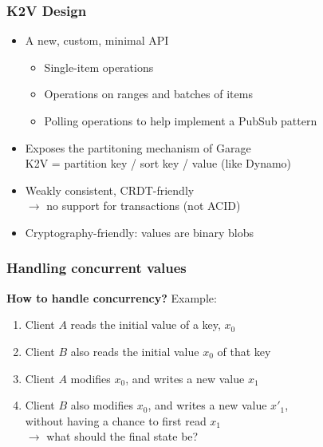 \documentclass[aspectratio=169]{beamer}
\begin{document}
\begin{frame}
	\frametitle{K2V Design}
	\begin{itemize}
		\item A new, custom, minimal API\\
			\vspace{.5em}
			\begin{itemize}
				\item Single-item operations
				\item Operations on ranges and batches of items
				\item Polling operations to help implement a PubSub pattern
			\end{itemize}
			\vspace{1em}
		\item<2-> Exposes the partitoning mechanism of Garage\\
			K2V = partition key / sort key / value (like Dynamo)
			\vspace{1em}
		\item<3-> Weakly consistent, CRDT-friendly\\
			$\to$ no support for transactions (not ACID)
			\vspace{1em}
		\item<4-> Cryptography-friendly: values are binary blobs
	\end{itemize}
\end{frame}

\begin{frame}
	\frametitle{Handling concurrent values}
	\textbf{How to handle concurrency?} Example:
	\vspace{1em}
	\begin{enumerate}
		\item Client $A$ reads the initial value of a key, $x_0$
			\vspace{1em}
		\item<2-> Client $B$ also reads the initial value $x_0$ of that key
			\vspace{1em}
		\item<3-> Client $A$ modifies $x_0$, and writes a new value $x_1$
			\vspace{1em}
		\item<4-> Client $B$ also modifies $x_0$, and writes a new value $x'_1$,\\
			without having a chance to first read $x_1$\\
			\vspace{1em}
			$\to$ what should the final state be?
	\end{enumerate}
\end{frame}
\end{document}
